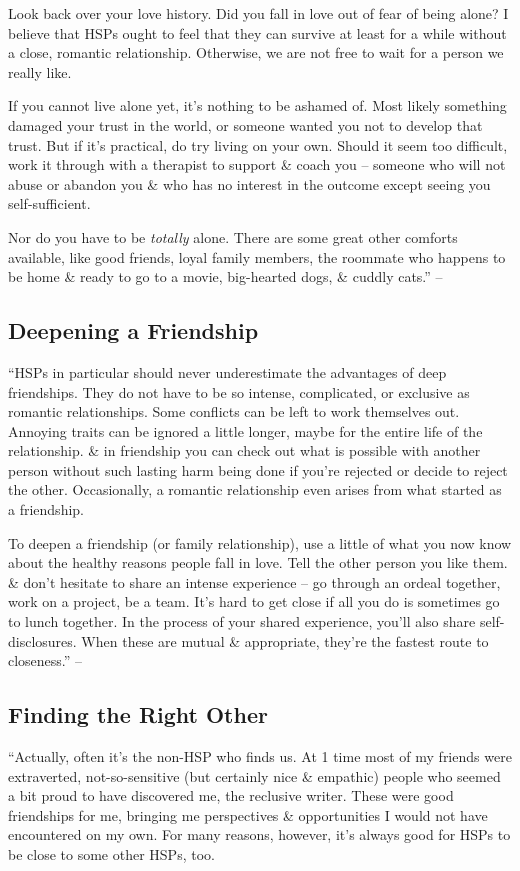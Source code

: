 \documentclass{article}
\numberwithin{equation}{section}
\begin{document}
Look back over your love history. Did you fall in love out of fear of being alone? I believe that HSPs ought to feel that they can survive at least for a while without a close, romantic relationship. Otherwise, we are not free to wait for a person we really like.

If you cannot live alone yet, it's nothing to be ashamed of. Most likely something damaged your trust in the world, or someone wanted you not to develop that trust. But if it's practical, do try living on your own. Should it seem too difficult, work it through with a therapist to support \& coach you -- someone who will not abuse or abandon you \& who has no interest in the outcome except seeing you self-sufficient.

Nor do you have to be \textit{totally} alone. There are some great other comforts available, like good friends, loyal family members, the roommate who happens to be home \& ready to go to a movie, big-hearted dogs, \& cuddly cats.'' -- \cite[pp. 178--179]{Aron2013}

\subsection{Deepening a Friendship}
``HSPs in particular should never underestimate the advantages of deep friendships. They do not have to be so intense, complicated, or exclusive as romantic relationships. Some conflicts can be left to work themselves out. Annoying traits can be ignored a little longer, maybe for the entire life of the relationship. \& in friendship you can check out what is possible with another person without such lasting harm being done if you're rejected or decide to reject the other. Occasionally, a romantic relationship even arises from what started as a friendship.

To deepen a friendship (or family relationship), use a little of what you now know about the healthy reasons people fall in love. Tell the other person you like them. \& don't hesitate to share an intense experience -- go through an ordeal together, work on a project, be a team. It's hard to get close if all you do is sometimes go to lunch together. In the process of your shared experience, you'll also share self-disclosures. When these are mutual \& appropriate, they're the fastest route to closeness.'' -- \cite[pp. 179--180]{Aron2013}

\subsection{Finding the Right Other}
``Actually, often it's the non-HSP who finds us. At 1 time most of my friends were extraverted, not-so-sensitive (but certainly nice \& empathic) people who seemed a bit proud to have discovered me, the reclusive writer. These were good friendships for me, bringing me perspectives \& opportunities I would not have encountered on my own. For many reasons, however, it's always good for HSPs to be close to some other HSPs, too.
\end{document}

